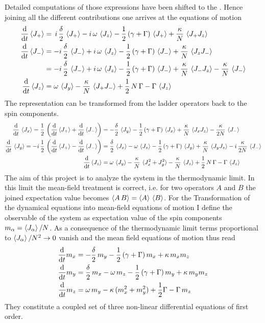 Detailed computations of those expressions have been shifted to the . Hence joining all the different contributions one arrives at the equations of motion
\begin{align}
    \frac{\text{d}}{\text{d}t} \braket{J_+}&=\,i\,\frac{\delta}{2}\,\braket{J_+}-i\,\omega\,\braket{J_z}-\frac{1}{2}\,(\gamma+\Gamma)\,\braket{J_+}+\frac{\kappa}{N}\,\braket{J_+ J_z}\notag\\
    \frac{\text{d}}{\text{d}t} \braket{J_-}&=-i\,\frac{\delta}{2}\,\braket{J_-}+i\,\omega\,\braket{J_z}-\frac{1}{2}\,(\gamma+\Gamma)\,\braket{J_-}+\frac{\kappa}{N}\,\braket{J_z J_-}\notag\\
    &=-i\,\frac{\delta}{2}\,\braket{J_-}+i\,\omega\,\braket{J_z}-\frac{1}{2}\,(\gamma+\Gamma)\,\braket{J_-}+\frac{\kappa}{N}\,\braket{J_- J_z}-\frac{\kappa}{N}\,\braket{J_-}\notag\\
    \frac{\text{d}}{\text{d}t} \braket{J_z}&=\omega\,\braket{J_y} - \frac{\kappa}{N}\,\braket{J_+ J_-}+\frac{1}{2}\,N\,\Gamma-\Gamma\,\braket{J_z}
\end{align}
The representation can be transformed from the ladder operators back to the spin components.
\begin{align*}
    \frac{\text{d}}{\text{d}t}\,\braket{J_x}=\frac{1}{2}\,\left(\frac{\text{d}}{\text{d}t} \braket{J_+}+\frac{\text{d}}{\text{d}t} \braket{J_-}\right)&=-\frac{\delta}{2}\,\braket{J_y}-\frac{1}{2}\,(\gamma+\Gamma)\,\braket{J_x}+\frac{\kappa}{N}\,\braket{J_xJ_z}-\frac{\kappa}{2N}\,\braket{J_-}\\
    \frac{\text{d}}{\text{d}t}\,\braket{J_y}=-i\,\frac{1}{2}\,\left(\frac{\text{d}}{\text{d}t} \braket{J_+}-\frac{\text{d}}{\text{d}t} \braket{J_-}\right)&=\frac{\delta}{2}\,\braket{J_x}-\omega\,\braket{J_z}-\frac{1}{2}\,(\gamma+\Gamma)\,\braket{J_y}+\frac{\kappa}{N}\,\braket{J_yJ_z}-i\,\frac{\kappa}{2N}\,\braket{J_-}\\
    \frac{\text{d}}{\text{d}t} \braket{J_z}&=\omega\,\braket{J_y} - \frac{\kappa}{N}\,\braket{J_x^2+J_y^2} -\frac{\kappa}{N}\,\braket{J_z}+\frac{1}{2}\,N\,\Gamma-\Gamma\,\braket{J_z}
\end{align*}
The aim of this project is to analyze the system in the thermodynamic limit. In this limit the mean-field treatment is correct, i.e. for two operators $A$ and $B$ the joined expectation value becomes $\braket{A\,B}=\braket{A}\,\braket{B}$. For the Transformation of the dynamical equations into mean-field equations of motion I define the observable of the system as expectation value of the spin components $m_\alpha=\braket{J_\alpha}/N$. As a consequence of the thermodynamic limit terms proportional to $\braket{J_\alpha}/N^2\rightarrow0$ vanish and the mean field equations of motion thus read
\begin{align}
    \frac{\text{d}}{\text{d}t} m_x &= -\frac{\delta}{2}\,m_y-\frac{1}{2}\,(\gamma+\Gamma)\,m_x+\kappa\,m_x m_z\notag\\
    \frac{\text{d}}{\text{d}t} m_y &= \frac{\delta}{2}\,m_x-\omega\,m_z-\frac{1}{2}\,(\gamma+\Gamma)\,m_y+\kappa\,m_y m_z\notag\\
    \frac{\text{d}}{\text{d}t} m_z &= \omega\,m_y - \kappa\,(m_x^2+m_y^2)+\frac{1}{2}\Gamma-\Gamma\,m_z
\end{align}
They constitute a coupled set of three non-linear differential equations of first order.